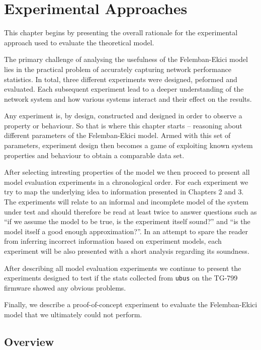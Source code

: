 
\chapter{Experimental Approaches}

This chapter begins by presenting the overall rationale for the experimental
approach used to evaluate the theoretical model.

The primary challenge of analysing the usefulness of the Felemban-Ekici model
lies in the practical problem of accurately capturing network performance
statistics. In total, three different experiments were designed, peformed and
evaluated. Each subsequent experiment lead to a deeper understanding of the
network system and how various systems interact and their effect on the
results.

Any experiment is, by design, constructed and designed in order to observe a
property or behaviour. So that is where this chapter starts -- reasoning about
different parameters of the Felemban-Ekici model. Armed with this set of
parameters, experiment design then becomes a game of exploiting known system
properties and behaviour to obtain a comparable data set.

After selecting intresting properties of the model we then proceed to present
all model evaluation experiments in a chronological order. For each experiment
we try to map the underlying idea to information presented in Chapters 2 and
3. The experiments will relate to an informal and incomplete model of the
system under test and should therefore be read at least twice to answer
questions such as ``if we assume the model to be true, is the experiment
itself sound?'' and ``is the model itself a good enough approximation?''. In
an attempt to spare the reader from inferring incorrect information based on
experiment models, each experiment will be also presented with a short
analysis regarding its soundness.

After describing all model evaluation experiments we continue to present the
experiments designed to test if the stats collected from \texttt{ubus} on the
TG-799 firmware showed any obvious problems.

Finally, we describe a proof-of-concept experiment to evaluate the
Felemban-Ekici model that we ultimately could not perform.


\section{Overview}

